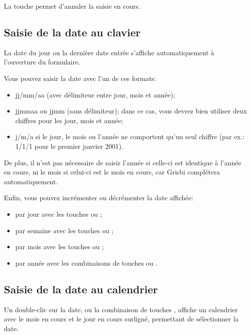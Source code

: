 La touche  permet d'annuler la saisie en cours.


\subsection{Saisie de la date au clavier\label{transactions-new-dates}}

La date du jour ou la dernière date entrée s'affiche automatiquement à l'ouverture du formulaire.

Vous pouvez saisir la date avec l'un de ces formats:
\begin{itemize}
	\item jj/mm/aa (avec délimiteur entre jour, mois et année);
	\item jjmmaa ou jjmm (sans délimiteur); dans ce cas, vous devrez bien utiliser deux chiffres pour les jour, mois et année;
	\item j/m/a si le jour, le mois ou l'année ne comportent qu'un seul chiffre (par ex.: 1/1/1 pour le premier janvier 2001).
\end{itemize}

De plus, il n'est pas nécessaire de saisir l'année si celle-ci est identique à l'année en cours, ni le mois si celui-ci est le mois en cours, car Grisbi complétera automatiquement.

Enfin, vous pouvez incrémenter ou décrémenter la date affichée:
\begin{itemize}
	\item par jour avec les touches \keys{{+}} ou \keys{{-}};
	\item par semaine avec les touches  ou ;
	\item par mois avec les touches ou ;
	\item par année avec les combinaisons de touches  ou .
\end{itemize}


\subsection{Saisie de la date au calendrier\label{transactions-new-calendar}}

Un double-clic sur la date, ou la combinaison de touches , affiche un calendrier avec le mois en cours et le jour en cours surligné, permettant de sélectionner la date.

